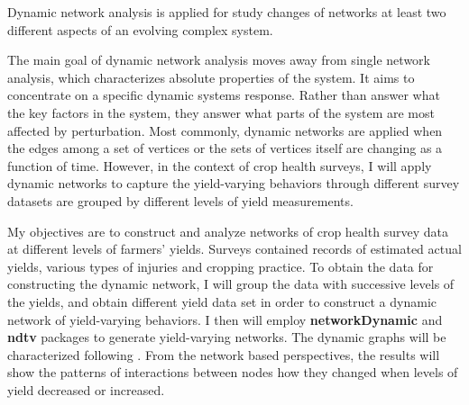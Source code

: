 \begin{enumerate}
Dynamic network analysis is applied for study changes of networks at least two different aspects of an evolving complex system. 

The main goal of dynamic network analysis moves away from single network analysis, which characterizes absolute properties of the system. It aims to concentrate on a specific dynamic systems response. Rather than answer what the key factors in the system, they answer what parts of the system are most affected by perturbation. Most commonly, dynamic networks are applied when the edges among a set of vertices or the sets of vertices itself are changing as a function of time. However, in the context of crop health surveys, I will apply dynamic networks to capture the yield-varying behaviors through different survey datasets are grouped by different levels of yield measurements.


My objectives are to construct and analyze networks of crop health survey data at different levels of farmers' yields. Surveys contained records of estimated actual yields, various types of injuries and cropping practice. To obtain the data for constructing the dynamic network, I will group the data with successive levels of the yields, and obtain different yield data set in order to construct a dynamic network of yield-varying behaviors. I then will employ \textbf{networkDynamic}  and \textbf{ndtv}  packages to generate yield-varying networks. The dynamic graphs will be characterized following . From the network based perspectives, the results will show the patterns of interactions between nodes how they changed when levels of yield decreased or increased.


\end{enumerate}

